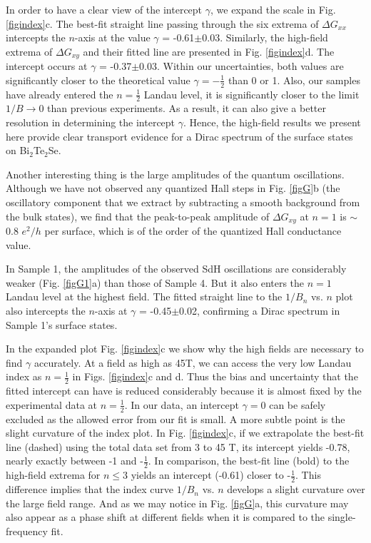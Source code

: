 In order to have a clear view of the intercept $\gamma$, we expand the scale in Fig. \ref{figindex}c. The best-fit straight line passing through the six extrema of $\Delta G_{xx}$ intercepts the $n$-axis at the value $\gamma$ = -0.61$\pm$0.03. Similarly, the high-field
extrema of $\Delta G_{xy}$ and their fitted line are presented in Fig. \ref{figindex}d. The intercept occurs at $\gamma$ = -0.37$\pm$0.03. Within our uncertainties, both values are significantly closer to the theoretical value $\gamma=-\frac12$ than 0 or 1. Also, our samples have already entered the $n=\frac12$ Landau level, it is significantly closer to the limit $1/B\to 0$ than previous experiments. As a result, it can also give a better resolution in determining the intercept $\gamma$. Hence, the high-field results we present here provide clear transport evidence for a Dirac spectrum of the surface states on Bi$_2$Te$_2$Se.

Another interesting thing is the large amplitudes of the quantum oscillations. Although we have not observed any quantized Hall steps in Fig. \ref{figG}b (the oscillatory component that we extract by subtracting a smooth background from the bulk states), we find that the peak-to-peak
amplitude of $\Delta G_{xy}$ at $n=1$ is $\sim$0.8 $e^2/h$ per surface, which is of the order
of the quantized Hall conductance value.

In Sample 1, the amplitudes of the observed SdH oscillations are considerably
weaker (Fig. \ref{figG1}a) than those of Sample 4. But it also enters the $n=1$ Landau level at the highest field. The fitted straight line to the $1/B_n$ vs. $n$ plot also intercepts the $n$-axis at $\gamma$ = -0.45$\pm$0.02, confirming a Dirac spectrum in Sample 1's surface states.

In the expanded plot Fig. \ref{figindex}c we show why the high fields are necessary to find $\gamma$ accurately. At a field as high as 45T, we can access the very low Landau index as $n=\frac12$ in Figs. \ref{figindex}c and d. Thus the bias and uncertainty that the fitted intercept can have is reduced considerably because it is almost fixed by the experimental data at $n=\frac12$. In our data, an intercept $\gamma = 0$ can be safely excluded as the allowed error from our fit is small. A more subtle point is the slight curvature of the index plot. In Fig. \ref{figindex}c, if we extrapolate the best-fit line (dashed) using the total data set from 3 to 45 T, its intercept yields -0.78, nearly exactly between -1 and
-$\frac12$. In comparison, the best-fit line (bold) to the high-field extrema
for $n\le$3 yields an intercept (-0.61) closer to -$\frac12$. This difference implies that the index curve
$1/B_n$ vs. $n$ develops a slight curvature over the large field range. And as we may notice in Fig. \ref{figG}a, this curvature may also appear as a phase shift at different fields when it is compared to the single-frequency fit. 


